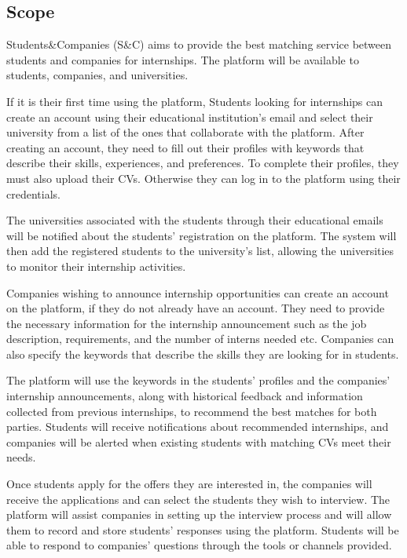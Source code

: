 \subsection{Scope}\label{subsec:scope}
Students\&Companies (S\&C) aims to provide the best matching service between students and companies for internships. The platform will be available
to students, companies, and universities.

If it is their first time using the platform, Students looking for internships can create an account using their educational institution's email and select their university from a list of the ones that collaborate with the platform. 
After creating an account, they need to fill out their profiles with keywords that describe their skills, experiences, and preferences. To complete
their profiles, they must also upload their CVs.
Otherwise they can log in to the platform using their credentials.

The universities associated with the students through their educational emails will be notified about the students' registration on the platform. 
The system will then add the registered students to the university’s list, allowing the universities to monitor their internship activities.

Companies wishing to announce internship opportunities can create an account on the platform, if they do not already have an account. They need to
provide the necessary information for the internship announcement such as the job description, requirements, and the number of interns needed etc. 
Companies can also specify the keywords that describe the skills they are looking for in students.

The platform will use the keywords in the students' profiles and the companies' internship announcements, along with historical feedback and 
information collected from previous internships, to recommend the best matches for both parties. Students will receive notifications about 
recommended internships, and companies will be alerted when existing students with matching CVs meet their needs.

Once students apply for the offers they are interested in, the companies will receive the applications and can select the students they wish 
to interview. The platform will assist companies in setting up the interview process and will allow them to record and store students' responses 
using the platform. Students will be able to respond to companies' questions through the tools or channels provided.

